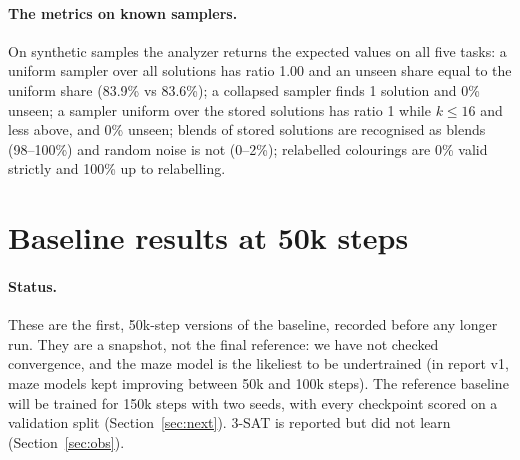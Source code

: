 \documentclass[11pt]{article}
\begin{document}
\paragraph{The metrics on known samplers.} On synthetic samples the analyzer returns the expected values on all five
tasks: a uniform sampler over all solutions has ratio 1.00 and an unseen share equal to the uniform share (83.9\% vs
83.6\%); a collapsed sampler finds 1 solution and 0\% unseen; a sampler uniform over the stored solutions has ratio 1
while $k\le16$ and less above, and 0\% unseen; blends of stored solutions are recognised as blends (98--100\%) and
random noise is not (0--2\%); relabelled colourings are 0\% valid strictly and 100\% up to relabelling.

\section{Baseline results at 50k steps}

\paragraph{Status.} These are the first, 50k-step versions of the baseline, recorded before any longer run. They are
a snapshot, not the final reference: we have not checked convergence, and the maze model is the likeliest to be
undertrained (in report v1, maze models kept improving between 50k and 100k steps). The reference baseline will be
trained for 150k steps with two seeds, with every checkpoint scored on a validation split (Section~\ref{sec:next}).
3-SAT is reported but did not learn (Section~\ref{sec:obs}).
\end{document}
